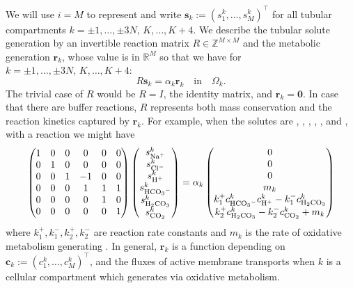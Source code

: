 \documentclass{article}
\begin{document}
We will use $i=M$ to represent  and write $\mathbf{s}_k := (s_1^k,\dots,s_M^k)^\top$ for all tubular compartments $k=\pm 1,\dots,\pm 3N,\, K,\dots,K+4$.
We describe the tubular solute generation by an invertible reaction matrix $R\in \mathbb{Z}^{M\times M}$ and the metabolic generation $\mathbf{r}_k$, whose value is in $\mathbb{R}^M$ so that we have for $k=\pm 1,\dots,\pm 3N,\, K,\dots,K+4$:
\begin{equation}\label{eq:gen}
    R \mathbf{s}_k = \alpha_k\mathbf{r}_k\quad\text{in}\quad \Omega_k.
\end{equation}
The trivial case of $R$ would be $R=I$, the identity matrix, and $\mathbf{r}_k=\mathbf{0}$.
In case that there are buffer reactions, $R$ represents both mass conservation and the reaction kinetics captured by $\mathbf{r}_k$.
For example, when the solutes are , , , , , and , with a reaction  we might have
\begin{equation*}
    \begin{pmatrix}
        1 & 0 & 0 & 0 & 0 & 0\\
        0 & 1 & 0 & 0 & 0 & 0\\
        0 & 0 & 1 & -1& 0 & 0\\
        0 & 0 & 0 & 1 & 1 & 1\\
        0 & 0 & 0 & 0 & 1 & 0\\
        0 & 0 & 0 & 0 & 0 & 1\\
    \end{pmatrix}
    \begin{pmatrix}
        s_{\ce{Na+}}^k \\  s_{\ce{Cl-}}^k \\ s_{\ce{H+}}^k \\ s_{\ce{HCO3-}}^k \\ s_{\ce{H2CO3}}^k \\ s_{\ce{CO2}}^k
    \end{pmatrix}
    = \alpha_k\begin{pmatrix}
        0 \\ 0 \\ 0 \\ m_k \\ k_1^+c_{\ce{HCO3-}}^kc_{\ce{H+}}^k-k_1^-c_{\ce{H2CO3}}^k\\
        k_2^+c_{\ce{H2CO3}}^k - k_2^-c_{\ce{CO2}}^k+m_k
    \end{pmatrix}
\end{equation*}
    where $k_1^+,k_1^-,k_2^+,k_2^-$ are reaction rate constants and $m_k$ is the rate of oxidative metabolism generating .
In general, $\mathbf{r}_k$ is a function depending on $\mathbf{c}_k:=(c_1^k,\dots,c_M^k)^\top$, and the fluxes of active membrane transports when $k$ is a cellular compartment which generates  via oxidative metabolism.
\end{document}
